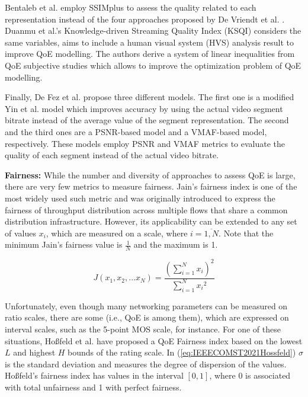 Bentaleb et al. \cite{Bentaleb2016} employ SSIMplus \cite{Rehman2015} to assess the quality related to each representation instead of the four approaches proposed by De Vriendt et al. \cite{DeVriendt2013}. Duanmu et al.'s Knowledge-driven Streaming Quality Index (KSQI) \cite{Duanmu2019} considers the same variables, aims to include a human visual system (HVS) analysis result to improve QoE modelling. The authors derive a system of linear inequalities from QoE subjective studies which allows to improve the optimization problem of QoE modelling.

Finally, De Fez et al. \cite{deFez2020} propose three different models. The first one is a modified Yin et al. \cite{Yin2014} model which improves accuracy by using the actual video segment bitrate instead of the average value of the segment representation. The second and the third ones are a PSNR-based model and a VMAF\cite{vmaf2016}-based model, respectively. These models employ PSNR and VMAF metrics to evaluate the quality of each segment instead of the actual video bitrate.

\textbf{Fairness:}
While the number and diversity of approaches to assess QoE is large, there are very few metrics to measure fairness. Jain's fairness index \cite{jain1984quantitative} is one of the most widely used such metric and was originally introduced to express the fairness of throughput distribution across multiple flows that share a common distribution infrastructure. However, its applicability can be extended to any set of values $x_i$, which are measured on a scale, where $i=\overline{1,N}$. Note that the minimum Jain's fairness value is $\frac{1}{N}$ and the maximum is 1.

\begin{equation}
	\label{eq:IEEECOMST2021Jain}
	J(x_1, x_2, ... x_N)=\frac{({\sum_{i=1}^{N}x_{i}})^2}{\sum_{i=1}^{N}{x_{i}}^2}
\end{equation}

Unfortunately, even though many networking parameters can be measured on ratio scales, there are some (i.e., QoE is among them), which are expressed on interval scales, such as the 5-point MOS scale, for instance. For one of these situations, Ho{\ss}feld et al. \cite{Hossfeld2016} have proposed a QoE Fairness index based on the lowest $L$ and highest $H$ bounds of the rating scale. In (\ref{eq:IEEECOMST2021Hossfeld}) $\sigma$ is the standard deviation and measures the degree of dispersion of the values. Ho{\ss}feld's fairness index has values in the interval $[0,1]$, where 0 is associated with total unfairness and 1 with perfect fairness.

